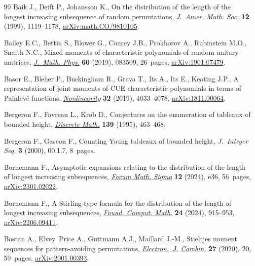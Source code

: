 \documentclass[pdftex]{sigma}
\numberwithin{equation}{section}
\theoremstyle{definition}
\begin{document}
\begin{thebibliography}{99}
Baik J., Deift P., Johansson K., On the distribution of the length of the
 longest increasing subsequence of random permutations,
 \href{https://doi.org/10.1090/S0894-0347-99-00307-0}{\textit{J.~Amer. Math.
 Soc.}} \textbf{12} (1999), 1119--1178,
 \href{http://arxiv.org/abs/math.CO/9810105}{arXiv:math.CO/9810105}.

Bailey E.C., Bettin S., Blower G., Conrey J.B., Prokhorov A., Rubinstein M.O.,
 Snaith N.C., Mixed moments of characteristic polynomials of random unitary
 matrices, \href{https://doi.org/10.1063/1.5092780}{\textit{J.~Math. Phys.}}
 \textbf{60} (2019), 083509, 26~pages,
 \href{http://arxiv.org/abs/1901.07479}{arXiv:1901.07479}.

Basor E., Bleher P., Buckingham R., Grava T., Its A., Its E., Keating J.P., A
 representation of joint moments of {CUE} characteristic polynomials in terms
 of {P}ainlev\'e functions,
 \href{https://doi.org/10.1088/1361-6544/ab28c7}{\textit{Nonlinearity}}
 \textbf{32} (2019), 4033--4078,
 \href{http://arxiv.org/abs/1811.00064}{arXiv:1811.00064}.

Bergeron F., Favreau L., Krob D., Conjectures on the enumeration of tableaux of
 bounded height, \href{https://doi.org/10.1016/0012-365X(94)00148-C}{\textit{Discrete Math.}} \textbf{139} (1995), 463--468.

Bergeron F., Gascon F., Counting {Y}oung tableaux of bounded height,
 \textit{J.~Integer Seq.} \textbf{3} (2000), 00.1.7, 8~pages.

Bornemann F., Asymptotic expansions relating to the distribution of the length
 of longest increasing subsequences,
 \href{https://doi.org/10.1017/fms.2024.13}{\textit{Forum Math. Sigma}}
 \textbf{12} (2024), e36, 56~pages,
 \href{http://arxiv.org/abs/2301.02022}{arXiv:2301.02022}.

Bornemann F., A {S}tirling-type formula for the distribution of the length of
 longest increasing subsequences,
 \href{https://doi.org/10.1007/s10208-023-09604-z}{\textit{Found. Comput.
 Math.}} \textbf{24} (2024), 915--953,
 \href{http://arxiv.org/abs/2206.09411}{arXiv:2206.09411}.

Bostan A., Elvey~Price A., Guttmann A.J., Maillard J.-M., Stieltjes moment
 sequences for pattern-avoiding permutations,
 \href{https://doi.org/10.37236/9402}{\textit{Electron.~J. Combin.}}
 \textbf{27} (2020), 20, 59~pages,
 \href{http://arxiv.org/abs/2001.00393}{arXiv:2001.00393}.


\end{thebibliography}
\end{document}
